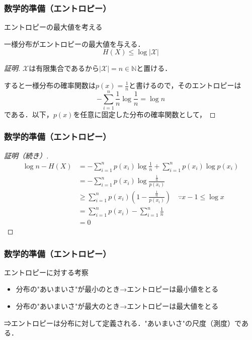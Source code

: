 \documentclass{classes/myslide}
\begin{document}
\begin{frame}\frametitle{数学的準備（エントロピー）}
  エントロピーの最大値を考える
  \begin{theorem}[エントロピーの最大値]
    一様分布がエントロピーの最大値を与える．
    \[H(X) \leq \log |\mathcal{X}| \]
  \end{theorem}
  \begin{proof}[証明]
    $\mathcal{X}$は有限集合であるから$|\mathcal{X}| = n \in \mathbb{N}$と置ける．

    すると一様分布の確率関数は$p(x) = \frac{1}{n}$と書けるので，そのエントロピーは
      \[ - \sum_{i = 1}^{n} \frac{1}{n} \log \frac{1}{n} = \log n \]
    である．以下，$p(x)$を任意に固定した分布の確率関数として，
    \let\qedsymbol\relax
  \end{proof}
\end{frame}

\begin{frame}\frametitle{数学的準備（エントロピー）}
  \begin{proof}[証明（続き）]
    \begin{align*}
      \log n - H(X) 
      &= -\sum_{i = 1}^{n} p(x_i) \log \frac{1}{n} + \sum_{i = 1}^{n} p(x_i) \log p(x_i) \\
      &= -\sum_{i = 1}^n p(x_i) \log \frac{\frac{1}{n}}{p(x_i)} \\
      &\geq \sum_{i = 1}^n p(x_i) \left( 1 - \frac{\frac{1}{n}}{p(x_i)}\right)\quad \because x - 1 \leq \log x \\
      &= \sum_{i = 1}^n p(x_i) - \sum_{i = 1}^{n} \frac{1}{n} \\
      &= 0
    \end{align*}
  \end{proof}
\end{frame}

\begin{frame}\frametitle{数学的準備（エントロピー）}
  \begin{alertblock}{エントロピーに対する考察}
    \begin{itemize}
      \item 分布の"あいまいさ"が最小のとき→エントロピーは最小値をとる
      \item 分布の"あいまいさ"が最大のとき→エントロピーは最大値をとる
    \end{itemize}
    ⇒エントロピーは分布に対して定義される．"あいまいさ"の尺度（測度）である．
  \end{alertblock}
\end{frame}
\end{document}
